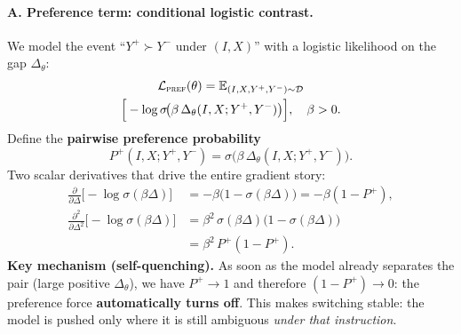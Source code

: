 \paragraph{\textbf{A. Preference term: conditional logistic contrast.}}
We model the event ``$Y^+\succ Y^-$ under $(I,X)$'' with a logistic likelihood on the gap $\Delta_\theta$:
{\footnotesize
\begin{multline*}
\mathcal{L}_{\textsc{pref}}(\theta)
=
\mathbb{E}_{(I,X,Y^+,Y^-)\sim\mathcal{D}}\\
\Big[
-\log \sigma\!\big(\beta\,\Delta_\theta(I,X;Y^+,Y^-)\big)
\Big],
\quad\beta>0.
\end{multline*}
}
Define the \textbf{pairwise preference probability}
\[
P^+(I,X;Y^+,Y^-)
=
\sigma\!\big(\beta\,\Delta_\theta(I,X;Y^+,Y^-)\big).
\]
Two scalar derivatives that drive the entire gradient story:
{\small
\begin{align*}
\frac{\partial}{\partial \Delta}\big[-\log \sigma(\beta\Delta)\big]
&=
-\beta\big(1-\sigma(\beta\Delta)\big)
=
-\beta(1-P^+),\\[4pt]
\frac{\partial^2}{\partial \Delta^2}\big[-\log \sigma(\beta\Delta)\big]
&=
\beta^2\,\sigma(\beta\Delta)\big(1-\sigma(\beta\Delta)\big)\\
&=
\beta^2\,P^+(1-P^+).
\end{align*}
}
\textbf{Key mechanism (self-quenching).} As soon as the model already separates the pair (large positive $\Delta_\theta$), we have $P^+\to 1$ and therefore $(1-P^+)\to 0$: the preference force \textbf{automatically turns off}. This makes switching stable: the model is pushed only where it is still ambiguous \emph{under that instruction}.

\vspace{-0.35em}
